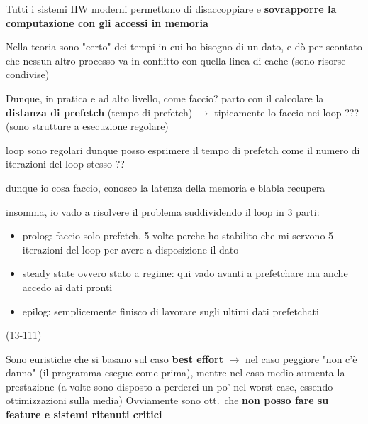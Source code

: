 \begin{emphasize}
  Tutti i sistemi HW moderni permettono di disaccoppiare e \textbf{sovrapporre la computazione con gli accessi in memoria}
\end{emphasize}

\begin{emphasize-blue}[frametitle={FINISCI}]
  Nella teoria sono "certo" dei tempi in cui ho bisogno di un dato, e d\`o per scontato che nessun altro processo va in conflitto con quella linea di cache (sono risorse condivise)

  Dunque, in pratica e ad alto livello, come faccio? parto con il calcolare la \textbf{distanza di prefetch} (tempo di prefetch) $\rightarrow$ tipicamente lo faccio nei loop ??? (sono strutture a esecuzione regolare)

  loop sono regolari dunque posso esprimere il tempo di prefetch come il numero di iterazioni del loop stesso ??

  dunque io cosa faccio, conosco la latenza della memoria e blabla recupera

  insomma, io vado a risolvere il problema suddividendo il loop in 3 parti: 
  \begin{itemize}
    \item prolog: faccio solo prefetch, 5 volte perche ho stabilito che mi servono 5 iterazioni del loop per avere a disposizione il dato
    \item steady state ovvero stato a regime: qui vado avanti a prefetchare ma anche accedo ai dati pronti
    \item epilog: semplicemente finisco di lavorare sugli ultimi dati prefetchati
  \end{itemize}

  (13-111)
\end{emphasize-blue}

\begin{emphasize}
  Sono euristiche che si basano sul caso \textbf{best effort} $\rightarrow$ nel caso peggiore "non c'\`e danno" (il programma esegue come prima), mentre nel caso medio aumenta la prestazione (a volte sono disposto a perderci un po' nel worst case, essendo ottimizzazioni sulla media) 
  Ovviamente sono ott.~che \textbf{non posso fare su feature e sistemi ritenuti critici}
\end{emphasize}


